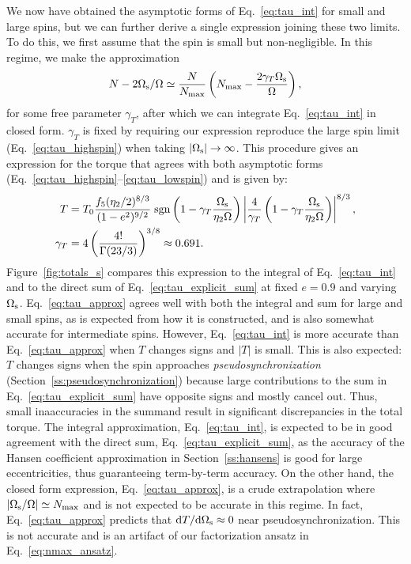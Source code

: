 \documentclass[
        fleqn,
        usenatbib,
    ]{mnras}
\newcommand*{\rdil}[2]{\mathrm{d}#1 / \mathrm{d}#2}
\newcommand*{\abs}[1]{\left|#1\right|}
\newcommand*{\p}[1]{\left(#1\right)}
\begin{document}
We now have obtained the asymptotic forms of Eq.~\eqref{eq:tau_int} for small
and large spins, but we can further derive a single expression joining these two
limits. To do this, we first assume that the spin is small but non-negligible.
In this regime, we make the approximation
\begin{equation}
    N - 2\Omega_{\rm s} / \Omega \simeq \frac{N}{N_{\max}}
        \left(N_{\max} - \frac{2\gamma_T
        \Omega_{\rm s}}{\Omega}\right)\label{eq:nmax_ansatz},
\end{equation}
for some free parameter $\gamma_T$, after which we can integrate
Eq.~\eqref{eq:tau_int} in closed form. $\gamma_T$ is fixed by requiring our
expression reproduce the large spin limit (Eq.~\ref{eq:tau_highspin}) when
taking $\abs{\Omega_{\rm s}} \to \infty$. This procedure gives an expression for
the torque that agrees with both asymptotic forms
(Eq.~\ref{eq:tau_highspin}--\ref{eq:tau_lowspin}) and is given by:
\begin{align}
    T &= T_0 \frac{f_5 (\eta_2/2)^{8/3}}{(1 - e^2)^{9/2}}
        \;\mathrm{sgn}\left(1 - \gamma_T\frac{\Omega_{\rm s}}{\eta_2\Omega}\right)
            \left|
                \frac{4}{\gamma_T}
                \p{1 - \gamma_T\frac{\Omega_{\rm s}}{\eta_2\Omega}}
            \right|^{8/3} ,\label{eq:tau_approx}\\
    \gamma_T &= 4\p{\frac{4!}{\Gamma(23/3)}}^{3/8} \approx 0.691.
\end{align}
Figure~\ref{fig:totals_s} compares this expression to the integral of
Eq.~\eqref{eq:tau_int} and to the direct sum of Eq.~\eqref{eq:tau_explicit_sum}
at fixed $e = 0.9$ and varying $\Omega_{\rm s}$. Eq.~\eqref{eq:tau_approx}
agrees well with both the integral and sum for large and small spins, as is
expected from how it is constructed, and is also somewhat accurate for
intermediate spins. However, Eq.~\eqref{eq:tau_int} is more accurate than
Eq.~\eqref{eq:tau_approx} when $T$ changes signs and $\abs{T}$ is small. This is
also expected: $T$ changes signs when the spin approaches
\emph{pseudosynchronization} (Section~\ref{ss:pseudosynchronization}) because
large contributions to the sum in Eq.~\eqref{eq:tau_explicit_sum} have opposite
signs and mostly cancel out. Thus, small inaaccuracies in the summand result in
significant discrepancies in the total torque. The integral approximation,
Eq.~\eqref{eq:tau_int}, is expected to be in good agreement with the direct sum,
Eq.~\eqref{eq:tau_explicit_sum}, as the accuracy of the Hansen coefficient
approximation in Section~\ref{ss:hansens} is good for large eccentricities, thus
guaranteeing term-by-term accuracy. On the other hand, the closed form
expression, Eq.~\eqref{eq:tau_approx}, is a crude extrapolation where
$\abs{\Omega_{\rm s} / \Omega} \simeq N_{\max}$ and is not expected to be
accurate in this regime. In fact, Eq.~\eqref{eq:tau_approx} predicts that
$\rdil{T}{\Omega_{\rm s}} \approx 0$ near pseudosynchronization. This is not
accurate and is an artifact of our factorization ansatz in
Eq.~\eqref{eq:nmax_ansatz}.
\end{document}
